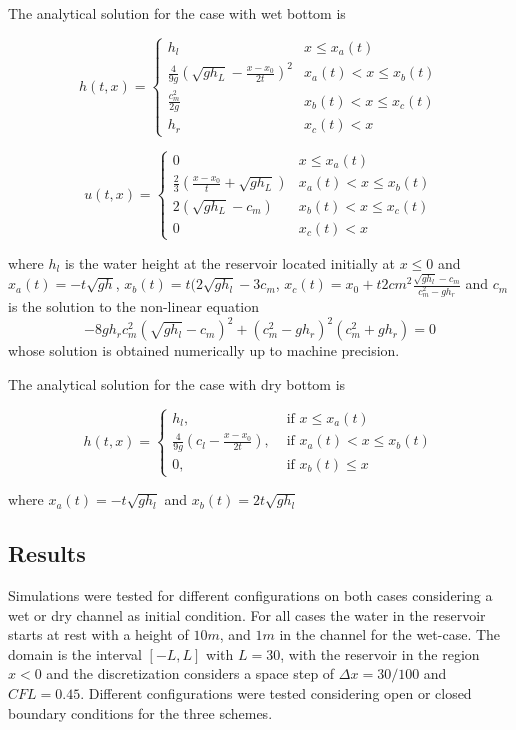 The analytical solution for the case with wet bottom is

\begin{equation}
	h(t,x) = \begin{cases}
		h_l & x\leq x_a(t) \\
		\frac{4}{9g}\left(\sqrt{gh_L}- \frac{x-x_0}{2t} \right)^2 & x_a(t) < x \leq x_b(t) \\
		\frac{c_m^2}{2g} & x_b(t) < x \leq x_c(t) \\
		h_r & x_c(t) < x
	\end{cases}
\end{equation}

\begin{equation}
	u(t,x) = \begin{cases}
		0 & x \leq x_a(t)\\
		\frac{2}{3}\left( \frac{x-x_0}{t} + \sqrt{gh_L} \right) & x_a(t) < x \leq x_b(t) \\
		2(\sqrt{gh_L}-c_m) & x_b(t) < x \leq x_c(t) \\
		0 & x_c(t) < x
	\end{cases}
\end{equation}

 where $h_l$ is the water height at the reservoir located initially at $x\leq 0$ and $x_a(t)= -t\sqrt{gh}$, $x_b(t) = t(2\sqrt{gh_l} - 3c_m$, $x_c(t) = x_0 + t 2cm^2 \frac{\sqrt{gh_l}-c_m}{c_m^2-gh_r}$ and $c_m$ is the solution to the non-linear equation $$-8gh_rc_m^2(\sqrt{gh_l}-c_m)^2 + (c_m^2-gh_r)^2(c_m^2+gh_r)=0$$
 whose solution is obtained numerically up to machine precision. 

The analytical solution for the case with dry bottom is

\begin{equation}
	h(t,x) = \begin{cases}
		h_l, &\text{ if }x \leq x_a(t)\\
		\frac{4}{9g}\left(c_l - \frac{x-x_0}{2t}\right), &\text{ if }x_a(t)<x\leq x_b(t) \\
		0, &\text{ if } x_b(t)\leq x
	\end{cases}	
\end{equation}

where $x_a(t) = - t\sqrt{gh_l}$ and $x_b(t) = 2t \sqrt{gh_l}$

\subsection{Results}

	Simulations were tested for different configurations on both cases considering a wet or dry channel as initial condition. For all cases the water in the reservoir starts at rest with a height of $10m$, and $1m$ in the channel for the wet-case. The domain is the interval $[-L,L]$ with $L=30$, with the reservoir in the region $x<0$ and the discretization considers a space step of $\Delta x = 	30/100$ and $CFL=0.45$. Different configurations were tested considering open or closed boundary conditions for the three schemes.

